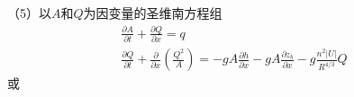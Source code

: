                                                                 （5）以$A$和$Q$为因变量的圣维南方程组
                                                                \begin{equation}
                                                                  \begin{gathered}
                                                                    \frac{\partial A}{\partial t}
                                                                    +
                                                                    \frac{\partial Q}{\partial x}
                                                                    =
                                                                    q
                                                                    \\
                                                                    \frac{\partial Q}{\partial t}
                                                                    +
                                                                    \frac{\partial}{\partial x}\left(\frac{Q^{2}}{A}\right)
                                                                    =
                                                                    -gA\frac{\partial h}{\partial x}
                                                                    -gA\frac{\partial z_{b}}{\partial x}
                                                                    -g\frac{n^{2}|U|}{R^{4/3}}Q
                                                                  \end{gathered}
                                                                  \label{EqCGe_SV_AQ_1}
                                                                \end{equation}
                                                                或
